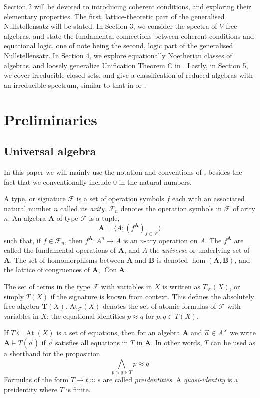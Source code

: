 \documentclass{article}
\theoremstyle{plain}
\theoremstyle{definition}
\begin{document}
Section 2 will be devoted to introducing coherent conditions, and exploring their elementary properties. The first, lattice-theoretic part of the generalised Nullstellensatz will be stated.
In Section 3, we consider the spectra of $V$-free algebras, and state the fundamental connections between coherent conditions and equational logic, one of note being the second, logic part of the generalised Nullstellensatz.
In Section 4, we explore equationally Noetherian classes of algebras, and loosely generalize Unification Theorem C in \cite{daniyarova2011algebraicgeometryalgebraicstructures}.
Lastly, in Section 5, we cover irreducible closed sets, and give a classification of reduced algebras with an irreducible spectrum, similar to that in \cite{daniyarova2011algebraicgeometryalgebraicstructures} or \cite{Daniyarova2008UnificationTI}.




\section{Preliminaries}

\subsection{Universal algebra}

In this paper we will mainly use the notation and conventions of \cite{burris}, besides the fact that we conventionally include $0$ in the natural numbers.

A type, or signature $\mathscr{F}$ is a set of operation symbols $f$ each with an associated natural number $n$ called its \textit{arity}. $\mathscr{F}_n$ denotes the operation symbols in $\mathscr{F}$ of arity $n$.
An algebra $\mathbf{A}$ of type $\mathscr{F}$ is a tuple,
$$\mathbf{A} = \langle A; (f^\mathbf{A})_{f\in \mathscr{F}}\rangle$$
such that, if $f \in \mathscr{F}_n$, then $f^\mathbf{A} \colon A^n \rightarrow A$ is an $n$-ary operation on $A$.
The $f^\mathbf{A}$ are called the fundamental operations of $\mathbf{A}$, and $A$ the \textit{universe} or underlying set of $\mathbf{A}$.
The set of homomorphisms between $\mathbf{A}$ and $\mathbf{B}$ is denoted $\hom(\mathbf{A}, \mathbf{B})$, and the lattice of congruences of $\mathbf{A}$, $\operatorname{Con}\mathbf{A}$.\par
The set of terms in the type $\mathscr{F}$ with variables in $X$ is written as $T_\mathscr{F}(X)$, or simply $T(X)$ if the signature is known from context.
This defines the absolutely free algebra $\mathbf{T}(X)$.
$\text{At}_\mathscr{F}(X)$ denotes the set of atomic formulas of $\mathscr{F}$ with variables in $X$; the equational identities $p\approx q$ for $p, q \in T(X)$.\par
If $T \subseteq \operatorname{At}(X)$ is a set of equations, then for an algebra $\mathbf{A}$ and $\vec{a}  \in A^X$ we write $\mathbf{A} \models T(\vec{a})$ if $\vec{a}$ satisfies all equations in $T$ in $\mathbf{A}$.
In other words, $T$ can be used as a shorthand for the proposition $$\bigwedge_{p\approx q \in T}p\approx q$$
Formulas of the form $T \rightarrow t\approx s$ are called \textit{preidentities}.
A \textit{quasi-identity} is a preidentity where $T$ is finite.\par
\end{document}
